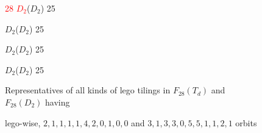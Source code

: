 \documentclass{beamer}
\begin{document}
\begin{frame}
\begin{figure}
\begin{center}
\begin{minipage}[b]{2.0cm}
\centering
{}\par
\textcolor{red}{28
 $D_2$}($D_2$) 25
\end{minipage}
\begin{minipage}[b]{2.0cm}
\centering
{}\par
 $D_2$($D_2$) 25
\end{minipage}
\begin{minipage}[b]{2.0cm}
\centering
{}\par
 $D_2$($D_2$) 25
\end{minipage}
\begin{minipage}[b]{2.0cm}
\centering
{}\par
 $D_2$($D_2$) 25
\end{minipage}
\end{center}
\vspace{2mm}

Representatives of all 
kinds of lego  tilings in $F_{28}(T_d)$ and $F_{28}(D_{2})$ having
  
lego-wise, $2,1,1,1,1,4,2,0,1,0,0$  and $3,1,3,3,0,5,5,1,1,2,1$ orbits 

\end{figure}


\end{frame}
\end{document}
